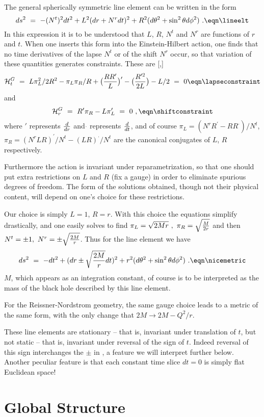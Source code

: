 The general spherically symmetric line element can be written
in the form
$$
ds^2~=~-(N^t)^2 dt^2 +  L^2 (dr + N^r dt )^2 +
R^2 (d\theta^2  +  \sin^2 \theta d\phi^2 )~.
\eqn\lineelt
$$
In this expression it is to be understood that $L$, $R$,
$N^t$ and $N^r$ are functions of $r$ and $t$.  When one inserts
this form into the Einstein-Hilbert action, one finds that
no time derivatives of the lapse $N^t$ or of the shift $N^r$ occur,
so that variation of these quantities generates constraints.
These are [\bcmn ,\polch ]
$$
{\cal H}^G_t~=~L\pi_L^2/ 2R^2 - \pi_L \pi_R / R +
\bigl( {R R^\prime \over L } \bigr)^\prime
- \bigl( {R^{\prime 2 }\over 2L }\bigr) - L/2 ~=~ 0
\eqn\lapseconstraint
$$
and
$$
{\cal H}^G_r~=~R^\prime \pi_R - L \pi_L^\prime ~=~ 0~,
\eqn\shiftconstraint
$$
where $\prime $ represents ${d\over dr}$ and
$\dot {}$ represents ${d\over dt}$, and of course
$\pi_L = (N^r R^\prime - RR^\cdot )/ N^t$,
$\pi_R = (N^rLR)^\prime/N^t - (LR)^\cdot /N^t$
are the canonical conjugates of $L$, $R$
respectively.

Furthermore the action is invariant under reparametrization,
so that one should put extra restrictions on
$L$ and $R$ (fix a gauge) in order to eliminate
spurious degrees of freedom.  The form of the solutions
obtained, though
not their physical content, will depend on one's choice
for these
restrictions.

Our choice is simply $L=1$, $R=r$.  With this choice the
equations simplify drastically, and
one easily solves to find
$\pi_L = \sqrt {2Mr }~,~ \pi_R = \sqrt {M\over 2r}$
and then $N^t = \pm 1,~ N^r = \pm \sqrt {2M\over r}$.
Thus for the line element we have
$$
ds^2~=~ -dt^2 + (dr \pm \sqrt {2M \over r} dt )^2 +
r^2 (d\theta^2  +  \sin^2 \theta d\phi^2 )~.
\eqn\nicemetric
$$
$M$, which appears as an integration constant, of course
is to be interpreted as the mass of the black hole described by
this line element.

For the Reissner-Nordstrom geometry, the same gauge choice leads
to a metric of the same form, with the only change that
$2M \rightarrow 2M - Q^2/r$.

These line elements are stationary -- that is, invariant under
translation of $t$,
but not static -- that is, invariant under reversal
of the sign of
$t$.  Indeed reversal of this sign interchanges the $\pm$
in \nicemetric , a feature we will interpret further below.
Another peculiar feature is that each
constant time slice
$dt=0$ is simply flat Euclidean space!


\chapter{Global Structure}


